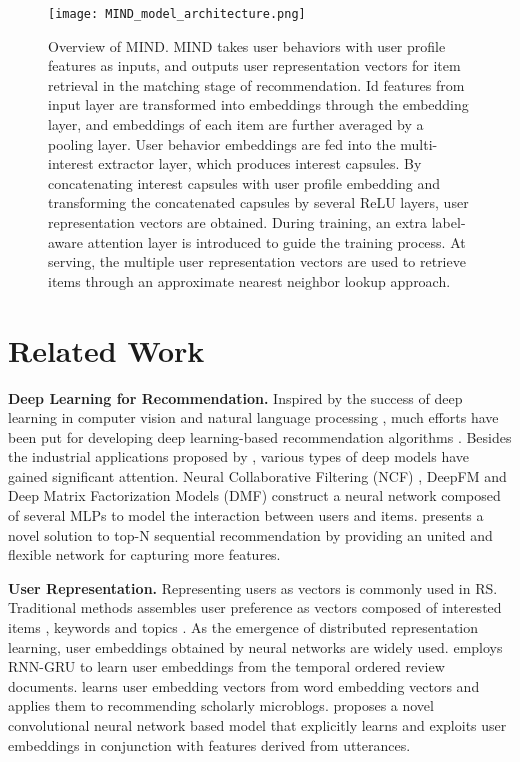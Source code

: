 \documentclass[sigconf]{acmart}
\begin{document}
\begin{figure*}[ht]
\centering
\texttt{[image: MIND\_model\_architecture.png]}
\caption{Overview of MIND.
MIND takes user behaviors with user profile features as inputs, and outputs user representation vectors for item retrieval in the matching stage of recommendation.
Id features from input layer are transformed into embeddings through the embedding layer, and embeddings of each item are further averaged by a pooling layer.
User behavior embeddings are fed into the multi-interest extractor layer, which produces interest capsules.
By concatenating interest capsules with user profile embedding and transforming the concatenated capsules by several ReLU layers, user representation vectors are obtained.
During training, an extra label-aware attention layer is introduced to guide the training process.
At serving, the multiple user representation vectors are used to retrieve items through an approximate nearest neighbor lookup approach.
}

\label{fig:ModelArchitecture}
\end{figure*}

\section{Related Work}

\textbf{Deep Learning for Recommendation.}
Inspired by the success of deep learning in computer vision and natural language processing \cite{lecun2015deep}, much efforts have been put for developing deep learning-based recommendation algorithms \cite{batmaz2018review}.
Besides the industrial applications proposed by \cite{covington2016deep,zhou2018deep}, various types of deep models have gained significant attention.
Neural Collaborative Filtering (NCF) \cite{he2017neural}, DeepFM \cite{guo2017deepfm} and Deep Matrix Factorization Models (DMF) \cite{xue2017deep} construct a neural network composed of several MLPs to model the interaction between users and items.
\cite{tang2018personalized} presents a novel solution to top-N sequential recommendation by providing an united and flexible network for capturing more features.

\textbf{User Representation.}
Representing users as vectors is commonly used in RS.
Traditional methods assembles user preference as vectors composed of interested items \cite{herlocker2002empirical,bell2007improved,sarwar2001item}, keywords \cite{cantador2010content,elkahky2015multi} and topics \cite{yin2015dynamic}.
As the emergence of distributed representation learning, user embeddings obtained by neural networks are widely used.
\cite{chen2016learning} employs RNN-GRU to learn user embeddings from the temporal ordered review documents.
\cite{yu2016user} learns user embedding vectors from word embedding vectors and applies them to recommending scholarly microblogs.
\cite{amir2016modelling} proposes a novel convolutional neural network based model that explicitly learns and exploits user embeddings in conjunction with features derived from utterances.
\end{document}
